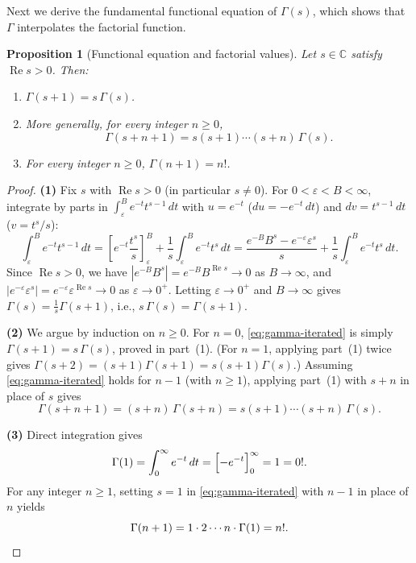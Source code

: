 \documentclass[11pt]{article}
\theoremstyle{plain}
\newtheorem{proposition}[theorem]{Proposition}
\theoremstyle{definition}
\theoremstyle{boldremark}
\theoremstyle{remark}
\numberwithin{equation}{section}
\newcommand{\C}{\mathbb{C}}
\DeclareMathOperator{\Real}{Re}
\begin{document}
Next we derive the fundamental functional equation of $\Gamma(s)$, which
shows that $\Gamma$ interpolates the factorial function.

\begin{proposition}[Functional equation and factorial values]\label{prop:gamma-func-eq}
Let $s\in\C$ satisfy $\Real s > 0$. Then:
\begin{enumerate}[label=\textup{(\arabic*)}]
 \item $\Gamma(s+1) = s\,\Gamma(s)$.
 \item More generally, for every integer $n\geq 0$,
       \begin{equation}\label{eq:gamma-iterated}
        \boxed{\displaystyle
         \Gamma(s+n+1) = s(s+1)\cdots(s+n)\,\Gamma(s).}
       \end{equation}
 \item For every integer $n\geq 0$, $\Gamma(n+1) = n!$.
\end{enumerate}
\end{proposition}

\begin{proof}
\textbf{(1)} Fix $s$ with $\Real s > 0$ (in particular $s\neq 0$). For
$0<\varepsilon<B<\infty$, integrate by parts in
$\int_{\varepsilon}^{B} e^{-t}t^{s-1}\,dt$ with $u=e^{-t}$
($du=-e^{-t}\,dt$) and $dv=t^{s-1}\,dt$ ($v=t^s/s$):
\[
 \int_{\varepsilon}^{B} e^{-t}t^{s-1}\,dt
 = \left[e^{-t}\frac{t^s}{s}\right]_{\varepsilon}^{B}
 + \frac{1}{s}\int_{\varepsilon}^{B} e^{-t}t^s\,dt
 = \frac{e^{-B}B^s - e^{-\varepsilon}\varepsilon^s}{s}
 + \frac{1}{s}\int_{\varepsilon}^{B} e^{-t}t^s\,dt.
\]
Since $\Real s > 0$, we have
$|e^{-B}B^s| = e^{-B}B^{\Real s}\to 0$ as $B\to\infty$, and
$|e^{-\varepsilon}\varepsilon^s| = e^{-\varepsilon}\varepsilon^{\Real s}\to 0$
as $\varepsilon\to 0^+$. Letting $\varepsilon\to 0^+$ and $B\to\infty$
gives $\Gamma(s)=\frac{1}{s}\Gamma(s+1)$, i.e., $s\,\Gamma(s)=\Gamma(s+1)$.

\textbf{(2)} We argue by induction on $n\geq 0$. For $n=0$,
\eqref{eq:gamma-iterated} is simply $\Gamma(s+1)=s\,\Gamma(s)$, proved in
part~(1). (For $n=1$, applying part~(1) twice gives
$\Gamma(s+2)=(s+1)\Gamma(s+1)=s(s+1)\Gamma(s)$.) Assuming
\eqref{eq:gamma-iterated} holds for $n-1$ (with $n\geq 1$), applying
part~(1) with $s+n$ in place of $s$ gives
\[
 \Gamma(s+n+1) = (s+n)\,\Gamma(s+n)
 = s(s+1)\cdots(s+n)\,\Gamma(s).
\]

\textbf{(3)} Direct integration gives
\[
 \Gamma(1) = \int_0^{\infty} e^{-t}\,dt
           = \Bigl[-e^{-t}\Bigr]_0^{\infty} = 1 = 0!.
\]
For any integer $n\geq 1$, setting $s=1$ in \eqref{eq:gamma-iterated} with
$n-1$ in place of $n$ yields
\[
 \Gamma(n+1) = 1\cdot 2\cdots n\cdot\Gamma(1) = n!. \qedhere
\]
\end{proof}
\end{document}
